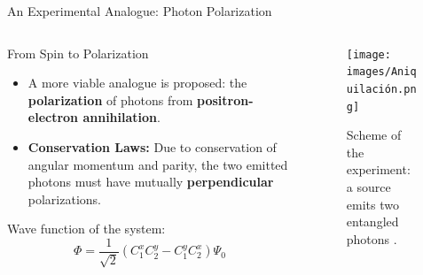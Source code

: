 \begin{frame}{An Experimental Analogue: Photon Polarization}

  \begin{columns}[T]
    \begin{column}{0.6\textwidth}
      \begin{block}{From Spin to Polarization}
        \begin{itemize}[<+->]
          \item A more viable analogue is proposed: the \textbf{polarization} of photons from \textbf{positron-electron annihilation}.
          \item \textbf{Conservation Laws:} Due to conservation of angular momentum and parity, the two emitted photons must have mutually \textbf{perpendicular} polarizations.
        \end{itemize}
      \end{block}
      \vspace{0.5em}
      Wave function of the system:
      $$ {\Phi} = \frac{1}{\sqrt{2}} \left( C_1^x C_2^y - C_1^y C_2^x \right) \Psi_0 $$
    \end{column}

    \begin{column}{0.4\textwidth}
      \begin{figure}
        \centering
        \texttt{[image: images/Aniquilación.png]}
        \caption{Scheme of the experiment: a source emits two entangled photons \cite{goole_esquema_2025}.}
      \end{figure}
    \end{column}
  \end{columns}

\end{frame}

